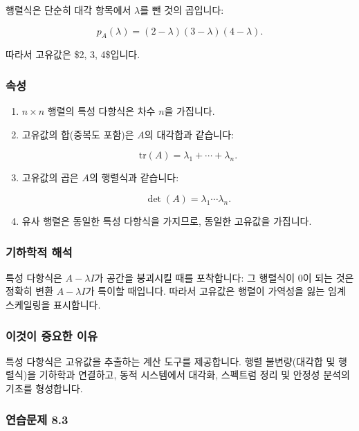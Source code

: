 \documentclass[
  12pt,
  a4paper,
]{article}
\begin{document}
행렬식은 단순히 대각 항목에서 \(\lambda\)를 뺀 것의 곱입니다:

\[p_A(\lambda) = (2-\lambda)(3-\lambda)(4-\lambda).\]

따라서 고유값은 \$2, 3, 4\$입니다.

\subsubsection{속성}\label{properties-2}

\begin{enumerate}
\def\labelenumi{\arabic{enumi}.}
\item
  \(n \times n\) 행렬의 특성 다항식은 차수 \(n\)을 가집니다.
\item
  고유값의 합(중복도 포함)은 \(A\)의 대각합과 같습니다:

  \[\text{tr}(A) = \lambda_1 + \cdots + \lambda_n.\]
\item
  고유값의 곱은 \(A\)의 행렬식과 같습니다:

  \[\det(A) = \lambda_1 \cdots \lambda_n.\]
\item
  유사 행렬은 동일한 특성 다항식을 가지므로, 동일한 고유값을 가집니다.
\end{enumerate}

\subsubsection{기하학적 해석}\label{geometric-interpretation-18}

특성 다항식은 \(A - \lambda I\)가 공간을 붕괴시킬 때를 포착합니다: 그 행렬식이 0이 되는 것은 정확히 변환 \(A - \lambda I\)가 특이할 때입니다. 따라서 고유값은 행렬이 가역성을 잃는 임계 스케일링을 표시합니다.

\subsubsection{이것이 중요한 이유}\label{why-this-matters-30}

특성 다항식은 고유값을 추출하는 계산 도구를 제공합니다. 행렬 불변량(대각합 및 행렬식)을 기하학과 연결하고, 동적 시스템에서 대각화, 스펙트럼 정리 및 안정성 분석의 기초를 형성합니다.

\subsubsection{연습문제 8.3}\label{exercises-83}
\end{document}
